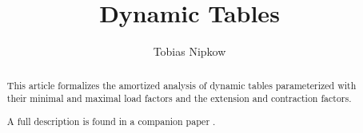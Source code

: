 \documentclass[11pt,a4paper]{article}
\begin{document}
\title{Dynamic Tables}
\author{Tobias Nipkow}
\maketitle

\begin{abstract}
  This article formalizes the amortized analysis of dynamic tables
  parameterized with their minimal and maximal load factors and the
  extension and contraction factors.

  A full description is found in a companion paper \cite{Nipkow-Tables}.
\end{abstract}





\end{document}
